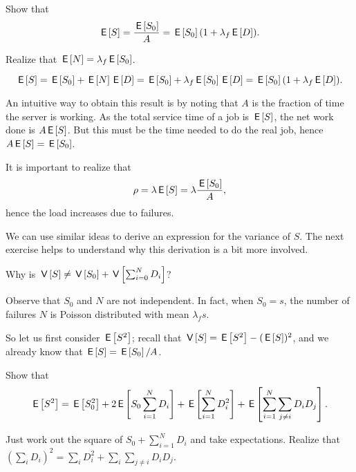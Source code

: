 \begin{exercise}[\faFlask]
  Show that 
  \begin{equation*}
\,\mathsf{E}\left[S\right] = \frac{\,\mathsf{E}\left[S_0\right]} A = \,\mathsf{E}\left[S_0\right] (1+\lambda_f \,\mathsf{E}\left[D\right]).
  \end{equation*}
  \begin{hint}
    Realize that $\,\mathsf{E}\left[N\right] = \lambda_f \,\mathsf{E}\left[S_0\right]$.
  \end{hint}
  \begin{solution}
    \begin{equation*}
      \,\mathsf{E}\left[S\right] = \,\mathsf{E}\left[S_0\right] + \,\mathsf{E}\left[N\right] \,\mathsf{E}\left[D\right] = \,\mathsf{E}\left[S_0\right] +  \lambda_f \,\mathsf{E}\left[S_0\right] \,\mathsf{E}\left[D\right]= \,\mathsf{E}\left[S_0\right](1+\lambda_f \,\mathsf{E}\left[D\right]).
    \end{equation*}
  \end{solution}
\end{exercise}
An intuitive way to obtain this result is by noting that $A$ is the fraction of time the server is working. As the total service time of a job is $\,\mathsf{E}\left[S\right]$, the net work done is $ A\,\mathsf{E}\left[S\right]$. But this must be the time needed to do the real job, hence $A \,\mathsf{E}\left[S\right] = \,\mathsf{E}\left[S_0\right]$.  

It is important to realize that 
\begin{equation*}
\rho = \lambda \,\mathsf{E}\left[S\right] = \lambda \frac{\,\mathsf{E}\left[S_0\right]}A,
\end{equation*}
hence the load increases due to failures. 


We can use similar ideas to derive an expression for the variance of $S$. The next exercise helps to  understand why this derivation is a bit more involved.
\begin{exercise}[\faFlask]
  Why is $\,\mathsf{V}\left[S\right] \neq \,\mathsf{V}\left[S_0\right] + \,\mathsf{V}\left[\sum_{i=0}^N D_i\right]$?
  \begin{solution}
    Observe that $S_0$ and $N$ are not independent. In fact, when $S_0=s$, the number of failures $N$ is Poisson distributed with mean $\lambda_f s$. 
  \end{solution}
\end{exercise}

So let us first consider $\,\mathsf{E}\left[S^2\right]$; recall that $\,\mathsf{V}\left[S\right] = \,\mathsf{E}\left[S^2\right] - (\,\mathsf{E}\left[S\right])^2$, and we already know that $\,\mathsf{E}\left[S\right] = \,\mathsf{E}\left[S_0\right]/A$. 

\begin{exercise}[\faFlask]
Show that 
\begin{equation*}
  \,\mathsf{E}\left[S^2\right] = \,\mathsf{E}\left[S_0^2\right] + 2\,\mathsf{E}\left[S_0 \sum_{i=1}^N D_i\right] + \,\mathsf{E}\left[\sum_{i=1}^N D_i^2\right] + \,\mathsf{E}\left[\sum_{i=1}^N \sum_{j\neq i} D_i D_j\right].
\end{equation*}
\begin{solution}
  Just work out the square of $S_0+\sum_{i=1}^N D_i$ and take expectations. Realize that $(\sum_i D_i)^2 = \sum_i D_i^2 + \sum_i\sum_{j\neq i} D_i D_j$.  
\end{solution}
\end{exercise}

